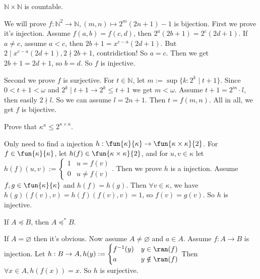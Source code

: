 \documentclass{ctexart}
\begin{document}
\begin{problem}
$\mathbb{N} \times \mathbb{N}$ is countable.
\end{problem}

\begin{solution}
	We will prove $f:\mathbb{N}^2\to \mathbb{N},(m,n)\mapsto 2^m(2n+1)-1$ is bijection. First we prove it's injection. Assume $f(a,b)=f(c,d)$, then $2^a(2b+1)=2^c(2d+1)$. If $a\neq c$, assume $a<c$, then $2b+1=x^{c-a}(2d+1)$. But $2\mid x^{c-a}(2d+1),2\nmid 2b+1$, contridiction! So $a=c$. Then we get $2b+1=2d+1$, so $b=d$. So $f$ is injective.

	Second we prove $f$ is surjective. For $t\in \mathbb{N}$, let $m:=\sup\{k:2^k\mid t+1\}$. Since $0<t+1<\omega$ and $2^k\mid t+1\to 2^k\leq t+1$ we get $m<\omega$. Assume $t+1=2^m\cdot l$, then easily $2\nmid l$. So we can assume $l=2n+1$. Then $t=f(m,n)$.
	All in all, we get $f$ is bijective.
\end{solution}

\begin{problem}
Prove that $\kappa^\kappa \leq 2^{\kappa \times \kappa}$.
\end{problem}

\begin{solution}
	Only need to find a injection $h:\fun{\kappa}{\kappa}\to \fun{\kappa\times \kappa}{2}$. For $f\in \fun{\kappa}{\kappa}$, let $h(f)\in \fun{\kappa\times \kappa}{2}$, and for $u,v\in \kappa$ let $h(f)(u,v):=\begin{cases}
			1 & u= f(v)    \\
			0 & u\neq f(v)
		\end{cases}$. Then we prove $h$ is a injection. Assume $f,g\in \fun{\kappa}{\kappa}$ and $h(f)=h(g)$. Then $\forall v\in \kappa$, we have $h(g)(f(v),v)=h(f)(f(v),v)=1$, so $f(v)=g(v)$. So $h$ is injective.
\end{solution}

\begin{problem}
If $A \preccurlyeq B$, then $A \preccurlyeq^* B$.
\end{problem}

\begin{solution}
	If $A=\varnothing$ then it's obvious. Now assume $A\neq \varnothing$ and $a\in A$. Assume $f:A\to B$ is injection. Let $h:B\to A,h(y):=\begin{cases}
			f^{-1}(y) & y\in \ran(f)    \\
			a         & y\notin \ran(f)
		\end{cases}$
	Then $\forall x\in A,h(f(x))=x$. So $h$ is surjective.
\end{solution}
\end{document}
